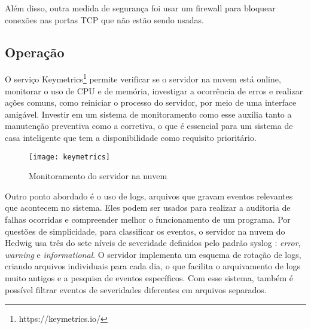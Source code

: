 Além disso, outra medida de segurança foi usar um firewall para bloquear conexões nas portas TCP que não estão sendo usadas.

\subsection{Operação}

O serviço Keymetrics\footnote{https://keymetrics.io/} permite verificar se o servidor na nuvem está online, monitorar o uso de CPU e de memória, investigar a ocorrência de erros e realizar ações comuns, como reiniciar o processo do servidor, por meio de uma interface amigável. Investir em um sistema de monitoramento como esse auxilia tanto a manutenção preventiva como a corretiva, o que é essencial para um sistema de casa inteligente que tem a disponibilidade como requisito prioritário.

\begin{figure}[H]
	\centering
	\caption{Monitoramento do servidor na nuvem}
  \texttt{[image: keymetrics]}
\label{fig:keymetrics}
\end{figure}

Outro ponto abordado é o uso de logs, arquivos que gravam eventos relevantes que acontecem no sistema. Eles podem ser usados para realizar a auditoria de falhas ocorridas e compreender melhor o funcionamento de um programa. Por questões de simplicidade, para classificar os eventos, o servidor na nuvem do Hedwig usa três do sete níveis de severidade definidos pelo padrão syslog \cite{rfc5424}: \emph{error}, \emph{warning} e \emph{informational}. O servidor implementa um esquema de rotação de logs, criando arquivos individuais para cada dia, o que facilita o arquivamento de logs muito antigos e a pesquisa de eventos específicos. Com esse sistema, também é possível filtrar eventos de severidades diferentes em arquivos separados.
